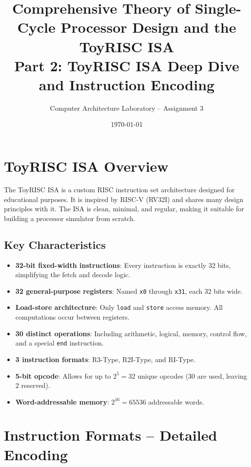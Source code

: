 \documentclass[12pt,a4paper]{article}
\title{\Huge\bfseries Comprehensive Theory of Single-Cycle Processor Design and the ToyRISC ISA\\[1em]
\Large Part 2: ToyRISC ISA Deep Dive and Instruction Encoding}
\author{Computer Architecture Laboratory -- Assignment 3}
\date{\today}
\begin{document}
\maketitle
\tableofcontents
\newpage

\section{ToyRISC ISA Overview}

The ToyRISC ISA is a custom RISC instruction set architecture designed for educational purposes. It is inspired by RISC-V (RV32I) and shares many design principles with it. The ISA is clean, minimal, and regular, making it suitable for building a processor simulator from scratch.

\subsection{Key Characteristics}

\begin{itemize}[leftmargin=*]
    \item \textbf{32-bit fixed-width instructions}: Every instruction is exactly 32 bits, simplifying the fetch and decode logic.
    \item \textbf{32 general-purpose registers}: Named \texttt{x0} through \texttt{x31}, each 32 bits wide.
    \item \textbf{Load-store architecture}: Only \texttt{load} and \texttt{store} access memory. All computations occur between registers.
    \item \textbf{30 distinct operations}: Including arithmetic, logical, memory, control flow, and a special \texttt{end} instruction.
    \item \textbf{3 instruction formats}: R3-Type, R2I-Type, and RI-Type.
    \item \textbf{5-bit opcode}: Allows for up to $2^5 = 32$ unique opcodes (30 are used, leaving 2 reserved).
    \item \textbf{Word-addressable memory}: $2^{16} = 65536$ addressable words.
\end{itemize}

\section{Instruction Formats -- Detailed Encoding}
\end{document}
